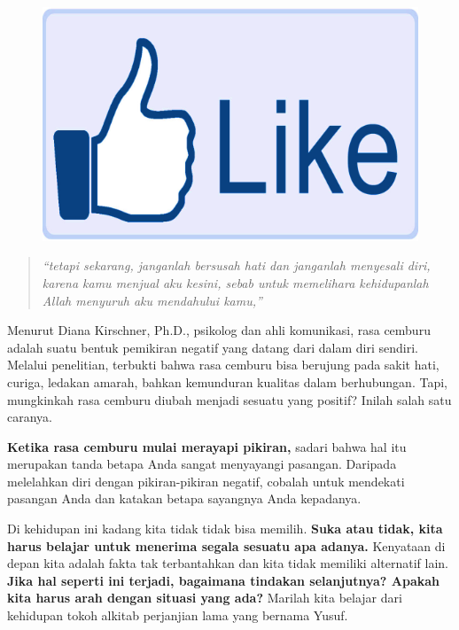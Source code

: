 \small
{}

\begin{figure}
\includegraphics[scale=0.5]{gambar/like.png}
\end{figure} 
\begin{quote}
\textit{``tetapi sekarang, janganlah bersusah hati dan janganlah menyesali diri, karena kamu menjual aku kesini, sebab untuk memelihara kehidupanlah Allah menyuruh aku mendahului kamu,''}
\end{quote}

Menurut Diana Kirschner, Ph.D., psikolog dan ahli komunikasi, rasa cemburu adalah suatu bentuk pemikiran negatif yang datang dari dalam diri sendiri. Melalui penelitian, terbukti bahwa rasa cemburu bisa berujung pada sakit hati, curiga, ledakan amarah, bahkan kemunduran kualitas dalam berhubungan. Tapi, mungkinkah rasa cemburu diubah menjadi sesuatu yang positif? Inilah salah satu caranya.

\textbf{Ketika rasa cemburu mulai merayapi pikiran,} sadari bahwa hal itu merupakan tanda betapa Anda sangat menyayangi pasangan. Daripada melelahkan diri dengan pikiran-pikiran negatif, cobalah untuk mendekati pasangan Anda dan katakan betapa sayangnya Anda kepadanya.

Di kehidupan ini kadang kita tidak tidak bisa memilih. \textbf{Suka atau tidak, kita harus belajar untuk menerima segala sesuatu apa adanya.} Kenyataan di depan kita adalah fakta tak terbantahkan dan kita tidak memiliki alternatif lain. \textbf{Jika hal seperti ini terjadi, bagaimana tindakan selanjutnya? Apakah kita harus arah dengan situasi yang ada?} Marilah kita belajar dari kehidupan tokoh alkitab perjanjian lama yang bernama Yusuf.

